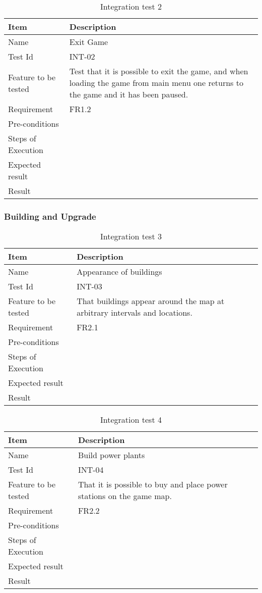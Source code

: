 \begin{table}[H]
\centering
	\begin{tabular}{ l | p{8cm} }
		\hline
		{\bf Item} & {\bf Description} \\ \hline
		Name & Exit Game \\ 
		Test Id & INT-02 \\ 
		Feature to be tested & Test that it is possible to exit the game, and when loading the game from main menu one returns to the game and it has been paused. \\ 
		Requirement & FR1.2 \\ 
		Pre-conditions & \\ 
		Steps of Execution & \\ 
		Expected result & \\ 
		Result & \\ 
	\end{tabular}
	\caption{Integration test 2}
\end{table}

\subsubsection{Building and Upgrade}

\begin{table}[H]
\centering
	\begin{tabular}{ l | p{8cm} }
		\hline
		{\bf Item} & {\bf Description} \\ \hline
		Name & Appearance of buildings  \\ 
		Test Id & INT-03 \\ 
		Feature to be tested & That buildings appear around the map at arbitrary intervals and locations. \\ 
		Requirement & FR2.1 \\ 
		Pre-conditions & \\ 
		Steps of Execution & \\ 
		Expected result & \\ 
		Result & \\ 
	\end{tabular}
	\caption{Integration test 3}
\end{table}

\begin{table}[H]
\centering
	\begin{tabular}{ l | p{8cm} }
		\hline
		{\bf Item} & {\bf Description} \\ \hline
		Name & Build power plants \\ 
		Test Id & INT-04 \\ 
		Feature to be tested & That it is possible to buy and place power stations on the game map. \\ 
		Requirement & FR2.2 \\ 
		Pre-conditions & \\ 
		Steps of Execution & \\ 
		Expected result & \\ 
		Result & \\ 
	\end{tabular}
	\caption{Integration test 4}
\end{table}

